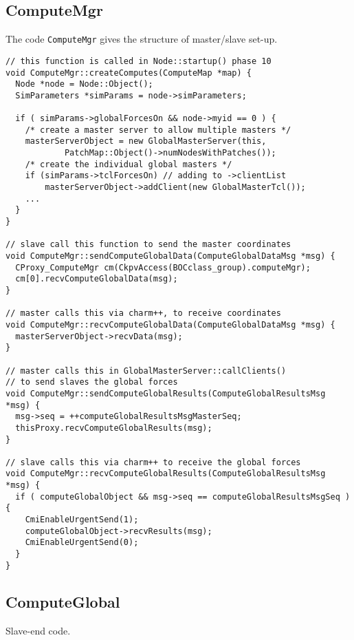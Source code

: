 \documentclass{article}
\begin{document}
\subsection{ComputeMgr}

The code \texttt{ComputeMgr}
gives the structure of master/slave set-up.
%
\begin{lstlisting}
// this function is called in Node::startup() phase 10
void ComputeMgr::createComputes(ComputeMap *map) {
  Node *node = Node::Object();
  SimParameters *simParams = node->simParameters;

  if ( simParams->globalForcesOn && node->myid == 0 ) {
    /* create a master server to allow multiple masters */
    masterServerObject = new GlobalMasterServer(this,
            PatchMap::Object()->numNodesWithPatches());
    /* create the individual global masters */
    if (simParams->tclForcesOn) // adding to ->clientList
        masterServerObject->addClient(new GlobalMasterTcl());
    ...
  }
}

// slave call this function to send the master coordinates
void ComputeMgr::sendComputeGlobalData(ComputeGlobalDataMsg *msg) {
  CProxy_ComputeMgr cm(CkpvAccess(BOCclass_group).computeMgr);
  cm[0].recvComputeGlobalData(msg);
}

// master calls this via charm++, to receive coordinates
void ComputeMgr::recvComputeGlobalData(ComputeGlobalDataMsg *msg) {
  masterServerObject->recvData(msg);
}

// master calls this in GlobalMasterServer::callClients()
// to send slaves the global forces
void ComputeMgr::sendComputeGlobalResults(ComputeGlobalResultsMsg *msg) {
  msg->seq = ++computeGlobalResultsMsgMasterSeq;
  thisProxy.recvComputeGlobalResults(msg);
}

// slave calls this via charm++ to receive the global forces
void ComputeMgr::recvComputeGlobalResults(ComputeGlobalResultsMsg *msg) {
  if ( computeGlobalObject && msg->seq == computeGlobalResultsMsgSeq ) {
    CmiEnableUrgentSend(1);
    computeGlobalObject->recvResults(msg);
    CmiEnableUrgentSend(0);
  }
}
\end{lstlisting}


\subsection{ComputeGlobal}

Slave-end code.
\end{document}

